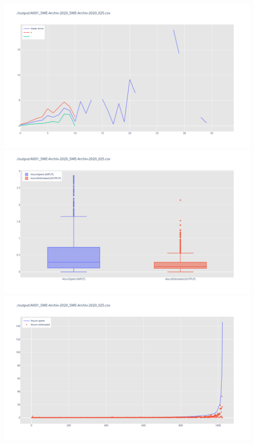 \includegraphics[width=\textwidth]{Scripts/output/A001_SWE-Archiv-2020_SWE-Archiv-2020_025.csv.error_distribution.png}
\includegraphics[width=\textwidth]{Scripts/output/A001_SWE-Archiv-2020_SWE-Archiv-2020_025.csv.png}
\includegraphics[width=\textwidth]{Scripts/output/A001_SWE-Archiv-2020_SWE-Archiv-2020_025.csv.scatter.png}
